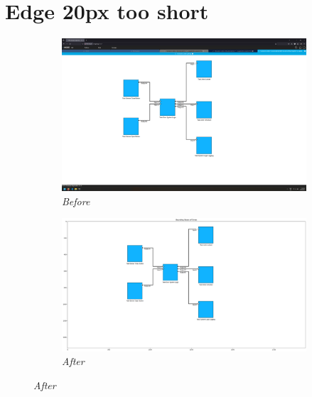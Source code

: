 \documentclass{article}
\begin{document}
\section{Edge 20px too short}
\begin{figure}[H]
    \centering
    \begin{subfigure}[t]{0.9\textwidth}
        \centering
        \includegraphics[width=\textwidth]{testcases/edge_20px_too_short/145244-393866_input_image.png}
        \caption*{\textit{Before}}
    \end{subfigure}
    \newline    
    \begin{subfigure}[t]{0.9\textwidth}
        \centering
        \includegraphics[width=\textwidth]{testcases/edge_20px_too_short/145304-754569_element_bbox_errors_labeled_colored.png}
        \caption*{\textit{After}}
    \end{subfigure}
    \label{fig:edge_too_short_20}
\end{figure}
\newpage
\end{document}
